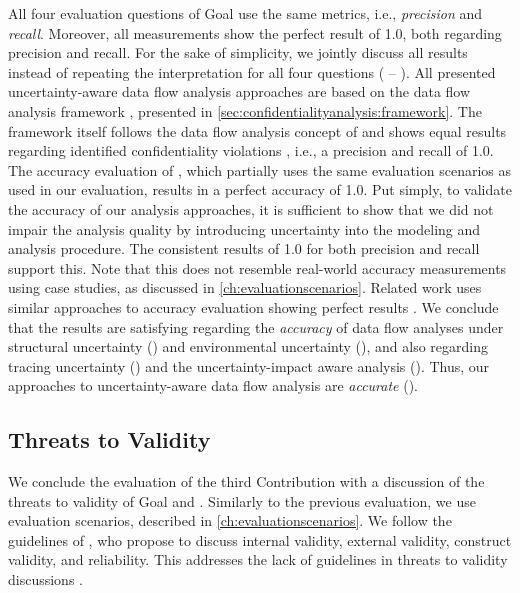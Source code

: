 All four evaluation questions of Goal  use the same metrics, i.e., \emph{precision} and \emph{recall}.
Moreover, all measurements show the perfect result of 1.0, both regarding precision and recall.
For the sake of simplicity, we jointly discuss all results instead of repeating the interpretation for all four questions ( -- ).
All presented uncertainty-aware data flow analysis approaches are based on the data flow analysis framework \cite{boltz_extensible_2024}, presented in \autoref{sec:confidentialityanalysis:framework}.
The framework itself follows the data flow analysis concept of \textcite{seifermann_architectural_2022} and shows equal results regarding identified confidentiality violations \cite{schwickerath_tool-supported_2023}, i.e., a precision and recall of 1.0.
The accuracy evaluation of \textcite{seifermann_architectural_2022}, which partially uses the same evaluation scenarios as used in our evaluation, results in a perfect accuracy of 1.0.
Put simply, to validate the accuracy of our analysis approaches, it is sufficient to show that we did not impair the analysis quality by introducing uncertainty into the modeling and analysis procedure.
The consistent results of 1.0 for both precision and recall support this.
Note that this does not resemble real-world accuracy measurements using case studies, as discussed in \autoref{ch:evaluationscenarios}.
Related work uses similar approaches to accuracy evaluation showing perfect results \cite{walter_context-based_2023,walter_architecture-based_2023,walter_architectural_2022-1,seifermann_detecting_2022,seifermann_data-driven_2019,boltz_modeling_2024}.
We conclude that the results are satisfying regarding the \emph{accuracy} of data flow analyses under structural uncertainty () and environmental uncertainty (), and also regarding tracing uncertainty () and the uncertainty-impact aware analysis ().
Thus, our approaches to uncertainty-aware data flow analysis are \emph{accurate} ().


\subsection{Threats to Validity}

We conclude the evaluation of the third Contribution  with a discussion of the threats to validity of Goal  and .
Similarly to the previous evaluation, we use evaluation scenarios, described in \autoref{ch:evaluationscenarios}.
We follow the guidelines of \textcite{runeson_guidelines_2009}, who propose to discuss internal validity, external validity, construct validity, and reliability.
This addresses the lack of guidelines in threats to validity discussions \cite{konersmann_evaluation_2022}.


